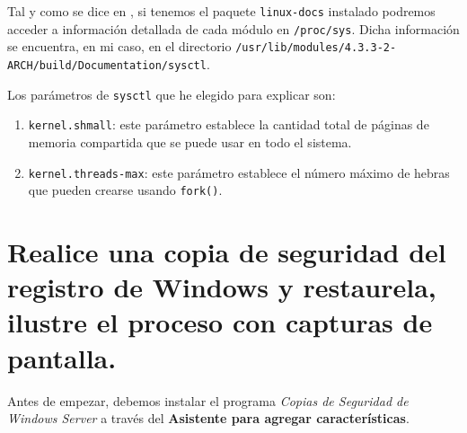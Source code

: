 \documentclass[10pt,a4paper,spanish]{article}
\numberwithin{equation}{section} %
\numberwithin{figure}{section} %
\numberwithin{table}{section} %
\begin{document}
Tal y como se dice en \cite{archsysctl}, si tenemos el paquete \texttt{linux-docs} instalado podremos acceder a información detallada de cada módulo en \texttt{/proc/sys}. Dicha información se encuentra, en mi caso, en el directorio \texttt{/usr/lib/modules/4.3.3-2-ARCH/build/Documentation/sysctl}. 

Los parámetros de \texttt{sysctl} que he elegido para explicar son:
\begin{enumerate}[---]
    \item \texttt{kernel.shmall}: este parámetro establece la cantidad total de páginas de memoria compartida que se puede usar en todo el sistema.
    \item \texttt{kernel.threads-max}: este parámetro establece el número máximo de hebras que pueden crearse usando \texttt{fork()}.
\end{enumerate}

\section{Realice una copia de seguridad del registro de Windows y restaurela, ilustre el proceso con capturas de pantalla.}
Antes de empezar, debemos instalar el programa \textit{Copias de Seguridad de Windows Server} a través del \textbf{Asistente para agregar características}.
\end{document}
